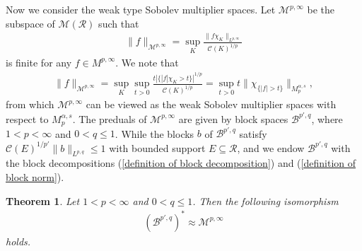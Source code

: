 \documentclass[10pt,reqno]{amsart}
\newtheorem{theorem}{Theorem}[section]
\numberwithin{equation}{section}
\begin{document}
Now we consider the weak type Sobolev multiplier spaces. Let $\mathcal{M}^{p,\infty}$ be the subspace of $\mathcal{M}(\mathcal{R})$ such that 
\begin{align*}
\|f\|_{\mathcal{M}^{p,\infty}}=\sup_{K}\frac{\|f\chi_{K}\|_{L^{p,\infty}}}{\mathcal{C}(K)^{1/p}}
\end{align*}
is finite for any $f\in M^{p,\infty}$. We note that  
\begin{align*}
\|f\|_{\mathcal{M}^{p,\infty}}=\sup_{K}\sup_{t>0}\frac{t|\{|f|\chi_{K}>t\}|^{1/p}}{\mathcal{C}(K)^{1/p}}=\sup_{t>0}t\|\chi_{\{|f|>t\}}\|_{M_{p}^{\alpha,s}},
\end{align*}
from which $\mathcal{M}^{p,\infty}$ can be viewed as the weak Sobolev multiplier spaces with respect to $M_{p}^{\alpha,s}$. The preduals of $\mathcal{M}^{p,\infty}$ are given by block spaces $\mathcal{B}^{p',q}$, where $1<p<\infty$ and $0<q\leq 1$. While the blocks $b$ of $\mathcal{B}^{p',q}$ satisfy $\mathcal{C}(E)^{1/p'}\|b\|_{L^{p,q}}\leq 1$ with bounded support $E\subseteq\mathcal{R}$, and we endow $\mathcal{B}^{p',q}$ with the block decompositions (\ref{definition of block decomposition}) and (\ref{definition of block norm}).
\begin{theorem}\label{weak dual}
Let $1<p<\infty$ and $0<q\leq 1$. Then the following isomorphism 
\begin{align*}
(\mathcal{B}^{p',q})^{\ast}\approx\mathcal{M}^{p,\infty}
\end{align*}
holds.
\end{theorem}
\end{document}
